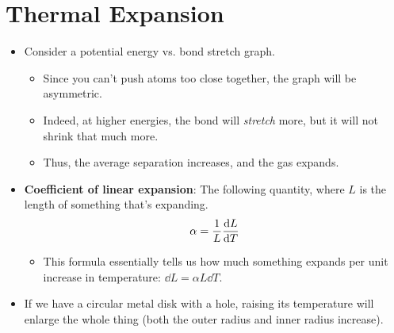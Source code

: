 \documentclass[../notes.tex]{subfiles}
\begin{document}
\section{Thermal Expansion}
\begin{itemize}
    \item Consider a potential energy vs. bond stretch graph.
    \begin{itemize}
        \item Since you can't push atoms too close together, the graph will be asymmetric.
        \item Indeed, at higher energies, the bond will \emph{stretch} more, but it will not shrink that much more.
        \item Thus, the average separation increases, and the gas expands.
    \end{itemize}
    \item \textbf{Coefficient of linear expansion}: The following quantity, where $L$ is the length of something that's expanding.
    \begin{equation*}
        \alpha = \frac{1}{L}\dv{L}{T}
    \end{equation*}
    \begin{itemize}
        \item This formula essentially tells us how much something expands per unit increase in temperature: $\dd{L}=\alpha L\dd{T}$.
    \end{itemize}
    \item If we have a circular metal disk with a hole, raising its temperature will enlarge the whole thing (both the outer radius and inner radius increase).
\end{itemize}
\end{document}
